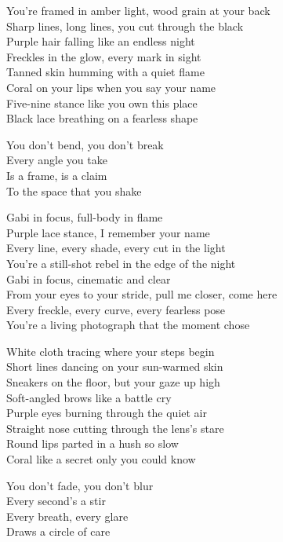 \begin{lyrics}
You’re framed in amber light, wood grain at your back\\
Sharp lines, long lines, you cut through the black\\
Purple hair falling like an endless night\\
Freckles in the glow, every mark in sight\\
Tanned skin humming with a quiet flame\\
Coral on your lips when you say your name\\
Five-nine stance like you own this place\\
Black lace breathing on a fearless shape

You don’t bend, you don’t break\\
Every angle you take\\
Is a frame, is a claim\\
To the space that you shake

Gabi in focus, full-body in flame\\
Purple lace stance, I remember your name\\
Every line, every shade, every cut in the light\\
You’re a still-shot rebel in the edge of the night\\
Gabi in focus, cinematic and clear\\
From your eyes to your stride, pull me closer, come here\\
Every freckle, every curve, every fearless pose\\
You’re a living photograph that the moment chose

White cloth tracing where your steps begin\\
Short lines dancing on your sun-warmed skin\\
Sneakers on the floor, but your gaze up high\\
Soft-angled brows like a battle cry\\
Purple eyes burning through the quiet air\\
Straight nose cutting through the lens’s stare\\
Round lips parted in a hush so slow\\
Coral like a secret only you could know

You don’t fade, you don’t blur\\
Every second’s a stir\\
Every breath, every glare\\
Draws a circle of care


\end{lyrics}
